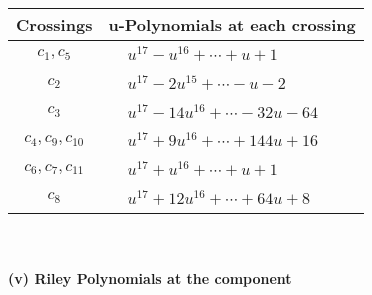 \documentclass[1p]{elsarticle_modified}
\theoremstyle{definition}
\begin{document}
\begin{tabular}{m{50pt}|m{274pt}}
Crossings & \hspace{64pt}u-Polynomials at each crossing \\
\hline $$\begin{aligned}c_{1},c_{5}\end{aligned}$$&$\begin{aligned}
&u^{17}- u^{16}+\cdots+u+1
\end{aligned}$\\
\hline $$\begin{aligned}c_{2}\end{aligned}$$&$\begin{aligned}
&u^{17}-2 u^{15}+\cdots- u-2
\end{aligned}$\\
\hline $$\begin{aligned}c_{3}\end{aligned}$$&$\begin{aligned}
&u^{17}-14 u^{16}+\cdots-32 u-64
\end{aligned}$\\
\hline $$\begin{aligned}c_{4},c_{9},c_{10}\end{aligned}$$&$\begin{aligned}
&u^{17}+9 u^{16}+\cdots+144 u+16
\end{aligned}$\\
\hline $$\begin{aligned}c_{6},c_{7},c_{11}\end{aligned}$$&$\begin{aligned}
&u^{17}+u^{16}+\cdots+u+1
\end{aligned}$\\
\hline $$\begin{aligned}c_{8}\end{aligned}$$&$\begin{aligned}
&u^{17}+12 u^{16}+\cdots+64 u+8
\end{aligned}$\\
\hline
\end{tabular}\\~\\
\newpage\renewcommand{\arraystretch}{1}
\flushleft \textbf{(v) Riley Polynomials at the component}\newline \\
\end{document}
